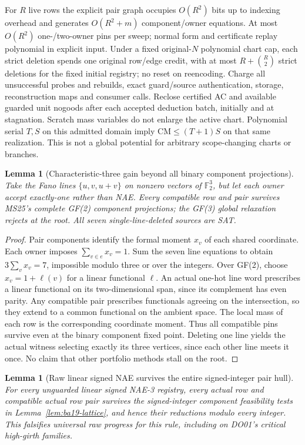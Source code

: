 \documentclass[11pt]{article}
\newtheorem{lemma}[theorem]{Lemma}
\begin{document}
For $R$ live rows the explicit pair graph occupies $O(R^2)$ bits up to indexing overhead and generates $O(R^2+m)$ component/owner equations. At most $O(R^2)$ one-/two-owner pins per sweep; normal form and certificate replay polynomial in explicit input. Under a fixed original-$N$ polynomial chart cap, each strict deletion spends one original row/edge credit, with at most $R+\binom R2$ strict deletions for the fixed initial registry; no reset on reencoding. Charge all unsuccessful probes and rebuilds, exact guard/source authentication, storage, reconstruction maps and consumer calls. Reclose certified AC and available guarded unit nogoods after each accepted deduction batch, initially and at stagnation. Scratch mass variables do not enlarge the active chart. Polynomial serial $T,S$ on this admitted domain imply $\mathrm{CM}\le(T+1)S$ on that same realization. This is not a global potential for arbitrary scope-changing charts or branches.
\begin{lemma}[Characteristic-three gain beyond all binary component projections]\label{lem:ba19-fano}
Take the Fano lines $\{u,v,u+v\}$ on nonzero vectors of $\mathbb F_2^3$, but let each owner accept exactly-one rather than NAE. Every compatible row and pair survives MS25's complete GF(2) component projections; the GF(3) global relaxation rejects at the root. All seven single-line-deleted sources are SAT.
\end{lemma}
\begin{proof}
Pair components identify the formal moment $x_v$ of each shared coordinate. Each owner imposes $\sum_{v\in e}x_v=1$. Sum the seven line equations to obtain $3\sum_v x_v=7$, impossible modulo three or over the integers. Over GF(2), choose $x_v=1+\ell(v)$ for a linear functional $\ell$. An actual one-hot line word prescribes a linear functional on its two-dimensional span, since its complement has even parity. Any compatible pair prescribes functionals agreeing on the intersection, so they extend to a common functional on the ambient space. The local mass of each row is the corresponding coordinate moment. Thus all compatible pins survive even at the binary component fixed point. Deleting one line yields the actual witness selecting exactly its three vertices, since each other line meets it once. No claim that other portfolio methods stall on the root.
\end{proof}
\begin{lemma}[Raw linear signed NAE survives the entire signed-integer pair hull]\label{lem:ba19-barrier}
For every unguarded linear signed NAE-3 registry, every actual row and compatible actual row pair survives the signed-integer component feasibility tests in Lemma~\ref{lem:ba19-lattice}, and hence their reductions modulo every integer. This falsifies universal raw progress for this rule, including on DO01's critical high-girth families.
\end{lemma}
\end{document}
